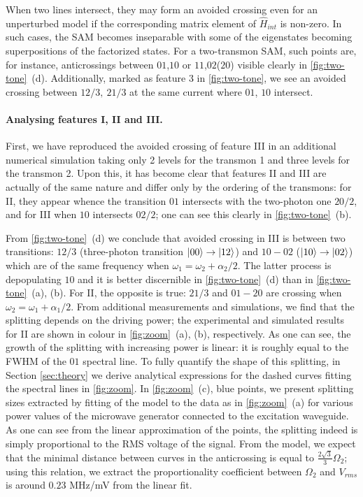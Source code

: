 \documentclass[%
 aps, prx,
 amsmath,amssymb,
 reprint,%
superscriptaddress
]{revtex4-2}
\begin{document}
When two lines intersect, they may form an 
avoided crossing even for an unperturbed model if 
the corresponding matrix 
element of $\hat H_{int}$ is non-zero. In such 
cases, the SAM becomes inseparable with some of 
the eigenstates becoming superpositions of the 
factorized states. For a two-transmon SAM, such 
points are, for instance, anticrossings between 
${01}$,${10}$ or $ {11} $,$ {02} $($ {20} $) 
visible clearly in \autoref{fig:two-tone}~(d). 
Additionally, marked as feature 3 in 
\autoref{fig:two-tone}, we see an avoided 
crossing between ${12}/3,\ {21}/3$ at the same 
current where ${01}$, ${10}$ intersect.


\paragraph{Analysing features I, II and III.} 
First, we have reproduced the avoided crossing of feature III in an additional numerical simulation taking only 2 levels for the transmon 1 and three levels for 
the transmon 2. Upon this, it has become clear 
that features II and III are actually of 
the same nature and differ only by the ordering 
of the transmons: for II, they appear whence the 
transition ${01}$ intersects with the two-photon 
one ${20/2}$, and for III when ${10}$ intersects ${02/2}$; 
one can see this clearly in 
\autoref{fig:two-tone}~(b).

From \autoref{fig:two-tone}~(d) we conclude that 
avoided crossing in III is between two 
transitions: ${12/3}$ (three-photon transition $\ket{00}\rightarrow\ket{12}$) and ${10} - {02}$ 
($\ket{10}\rightarrow\ket{02}$) which are of the 
same frequency when $\omega_1 = 
\omega_2+\alpha_2/2$. The latter process is depopulating $10$ and it is better discernible in \autoref{fig:two-tone}~(d) 
than in \autoref{fig:two-tone}~(a), (b). For II, the 
opposite is true: ${21/3}$ and ${01} - {20}$ are 
crossing when $\omega_2 = \omega_1+\alpha_1/2$. 
From additional measurements and simulations, we 
find that the splitting depends on the driving 
power; the experimental and simulated results for 
II are shown in colour in \autoref{fig:zoom}~(a), (b), respectively. As one can see, the growth of the splitting with 
increasing power is linear: it is roughly equal 
to the FWHM of the ${01}$ spectral line. To fully 
quantify the shape of this splitting, in Section 
\ref{sec:theory} we derive analytical expressions 
for the dashed curves fitting the spectral lines 
in \autoref{fig:zoom}. In \autoref{fig:zoom}~(c), blue points, we present splitting sizes extracted by fitting of the model to the data as in \autoref{fig:zoom}~(a) for various power values of the microwave generator connected to the excitation waveguide. As one can see from the linear approximation of the points, the splitting indeed is simply proportional to the RMS voltage of the signal. From the model, we expect that the minimal distance between curves in the anticrossing is equal to $\frac{2\sqrt{3}}{3} \Omega_2$; using this relation, we extract the proportionality coefficient between $\Omega_2$ and $V_{rms}$ is around $0.23$ MHz/mV from the linear fit.
\end{document}
